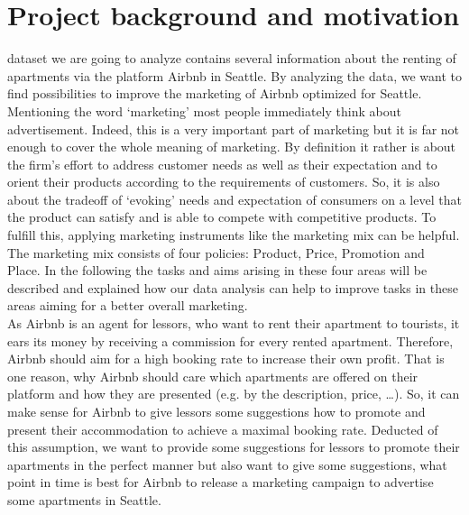 %
\IEEEpeerreviewmaketitle



\section{Project background and motivation}

 dataset we are going to analyze contains several information about the renting of apartments via the platform Airbnb in Seattle. By analyzing the data, we want to find possibilities to improve the marketing of Airbnb optimized for Seattle. Mentioning the word ‘marketing’ most people immediately think about advertisement. Indeed, this is a very important part of marketing but it is far not enough to cover the whole meaning of marketing. By definition it rather is about the firm’s effort to address customer needs as well as their expectation and to orient their products according to the requirements of customers. So, it is also about the tradeoff of ‘evoking’ needs and expectation of consumers on a level that the product can satisfy and is able to compete with competitive products. To fulfill this, applying marketing instruments like the marketing mix can be helpful. The marketing mix consists of four policies: Product, Price, Promotion and Place. In the following the tasks and aims arising in these four areas will be described and explained how our data analysis can help to improve tasks in these areas aiming for a better overall marketing.\\As Airbnb is an agent for lessors, who want to rent their apartment to tourists, it ears its money by receiving a commission for every rented apartment. Therefore, Airbnb should aim for a high booking rate to increase their own profit. That is one reason, why Airbnb should care which apartments are offered on their platform and how they are presented (e.g. by the description, price, …). So, it can make sense for Airbnb to give lessors some suggestions how to promote and present their accommodation to achieve a maximal booking rate. Deducted of this assumption, we want to provide some suggestions for lessors to promote their apartments in the perfect manner but also want to give some suggestions, what point in time is best for Airbnb to release a marketing campaign to advertise some apartments in Seattle. 
